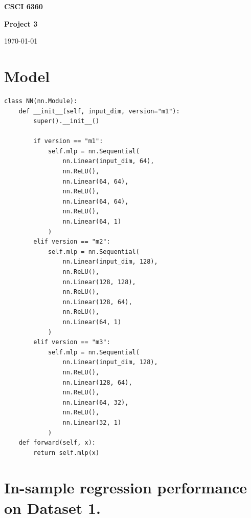 \documentclass[11pt]{article}
\date{}
\begin{document}
\begin{center} {\LARGE\textbf{{CSCI 6360}}}\end{center}
\begin{center}{\Large \textbf{Project 3}}\end{center}
\begin{center} \date{\today} \today \end{center}
    
\vspace{.1in}

\section{Model}
\begin{verbatim}
class NN(nn.Module):
    def __init__(self, input_dim, version="m1"):
        super().__init__()

        if version == "m1":
            self.mlp = nn.Sequential(
                nn.Linear(input_dim, 64),
                nn.ReLU(),
                nn.Linear(64, 64),
                nn.ReLU(),
                nn.Linear(64, 64),
                nn.ReLU(),
                nn.Linear(64, 1)
            )
        elif version == "m2":
            self.mlp = nn.Sequential(
                nn.Linear(input_dim, 128),
                nn.ReLU(),
                nn.Linear(128, 128),
                nn.ReLU(),
                nn.Linear(128, 64),
                nn.ReLU(),
                nn.Linear(64, 1)
            )
        elif version == "m3": 
            self.mlp = nn.Sequential(
                nn.Linear(input_dim, 128),
                nn.ReLU(),
                nn.Linear(128, 64),
                nn.ReLU(),
                nn.Linear(64, 32),
                nn.ReLU(),
                nn.Linear(32, 1)
            )
    def forward(self, x):
        return self.mlp(x)
\end{verbatim}

\section{In-sample regression performance on Dataset 1.}
\end{document}
